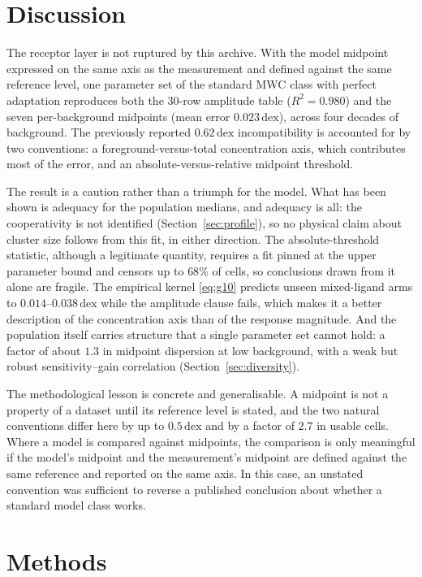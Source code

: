 ﻿\documentclass[11pt,a4paper]{article}
\newcommand{\dex}{\ensuremath{\,\mathrm{dex}}}
\begin{document}
\section{Discussion}

The receptor layer is not ruptured by this archive. With the model midpoint expressed on the same
axis as the measurement and defined against the same reference level, one parameter set of the
standard MWC class with perfect adaptation reproduces both the 30-row amplitude table
($R^2=0.980$) and the seven per-background midpoints (mean error $0.023\dex$), across four decades
of background. The previously reported $0.62\dex$ incompatibility is accounted for by two
conventions: a foreground-versus-total concentration axis, which contributes most of the error, and
an absolute-versus-relative midpoint threshold.

The result is a caution rather than a triumph for the model. What has been shown is adequacy for the
population medians, and adequacy is all: the cooperativity is not identified (Section~\ref{sec:profile}),
so no physical claim about cluster size follows from this fit, in either direction. The
absolute-threshold statistic, although a legitimate quantity, requires a fit pinned at the upper
parameter bound and censors up to $68\%$ of cells, so conclusions drawn from it alone are fragile.
The empirical kernel \eqref{eq:g10} predicts unseen mixed-ligand arms to $0.014$--$0.038\dex$ while
the amplitude clause fails, which makes it a better description of the concentration axis than of the
response magnitude. And the population itself carries structure that a single parameter set cannot
hold: a factor of about $1.3$ in midpoint dispersion at low background, with a weak but robust
sensitivity--gain correlation (Section~\ref{sec:diversity}).

The methodological lesson is concrete and generalisable. A midpoint is not a property of a dataset
until its reference level is stated, and the two natural conventions differ here by up to $0.5\dex$
and by a factor of $2.7$ in usable cells. Where a model is compared against midpoints, the
comparison is only meaningful if the model's midpoint and the measurement's midpoint are defined
against the same reference and reported on the same axis. In this case, an unstated convention was
sufficient to reverse a published conclusion about whether a standard model class works.

\section{Methods}
\label{sec:methods}
\end{document}
